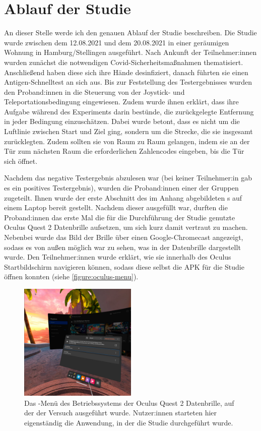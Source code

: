     \section{Ablauf der Studie}
        An dieser Stelle werde ich den genauen Ablauf der Studie beschreiben.
        Die Studie wurde zwischen dem 12.08.2021 und dem 20.08.2021 in einer geräumigen Wohnung in Hamburg/Stellingen ausgeführt. Nach Ankunft der Teilnehmer:innen wurden zunächst die notwendigen Covid-Sicherheitsmaßnahmen thematisiert.
        Anschließend haben diese sich ihre Hände desinfiziert, danach führten sie einen Antigen-Schnelltest an sich aus. Bis zur Feststellung des Testergebnisses wurden den Proband:innen in die Steuerung von der Joystick- und Teleportationsbedingung eingewiesen.
        Zudem wurde ihnen erklärt, dass ihre Aufgabe während des Experiments darin bestünde, die zurückgelegte Entfernung in jeder Bedingung einzuschätzen. Dabei wurde betont, dass es nicht um die Luftlinie zwischen Start und Ziel ging, sondern um die Strecke, die sie insgesamt zurücklegten. Zudem sollten sie von Raum zu Raum gelangen, indem sie an der Tür zum nächsten Raum die erforderlichen Zahlencodes eingeben, bis die Tür sich öffnet.

        Nachdem das negative Testergebnis abzulesen war (bei keiner Teilnehmer:in gab es ein positives Testergebnis), wurden die Proband:innen einer der Gruppen zugeteilt. Ihnen wurde der erste Abschnitt des im Anhang abgebildeten s auf einem Laptop bereit gestellt. Nachdem dieser ausgefüllt war, durften die Proband:innen das erste Mal die für die Durchführung der Studie genutzte Oculus Quest 2 Datenbrille aufsetzen, um sich kurz damit vertraut zu machen. Nebenbei wurde das Bild der Brille über einen Google-Chromecast angezeigt, sodass es von außen möglich war zu sehen, was in der Datenbrille dargestellt wurde. Den Teilnehmer:innen wurde erklärt, wie sie innerhalb des Oculus Startbildschirm navigieren können, sodass diese selbst die APK für die Studie öffnen konnten (siehe \autoref{figure:oculus-menu}).

        \begin{figure}[!h]
            \centering
            \includegraphics[width=0.5\textwidth]{vrscreenshots/oculusmenu.jpg}
            \caption{Das -Menü des Betriebssystems der Oculus Quest 2 Datenbrille, auf der der Versuch ausgeführt wurde. Nutzer:innen starteten hier eigenständig die Anwendung, in der die Studie durchgeführt wurde.}\label{figure:oculus-menu}
        \end{figure}

